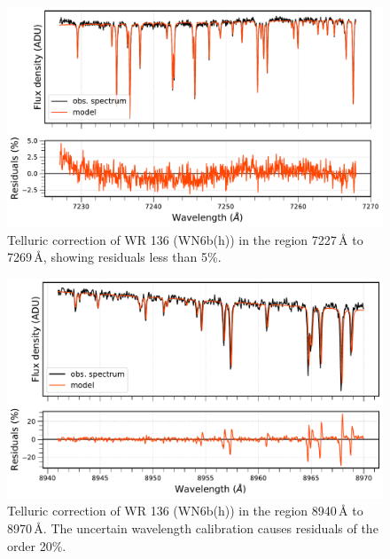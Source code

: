 \begin{figure}
    \centering
    \includegraphics[width=\hsize]{chapters/data_reduction/image/tell_corr_7227_7268.pdf}
    \caption{Telluric correction of WR 136 (WN6b(h)) in the region 7227\,\r{A} to 7269\,\r{A}, showing residuals less than 5\%.}
    \label{fig:tell_corr_7227}
\end{figure}

\begin{figure}
    \centering
    \includegraphics[width=\hsize]{chapters/data_reduction/image/tell_corr_8940_8970.pdf}
    \caption{Telluric correction of WR 136 (WN6b(h)) in the region 8940\,\r{A} to 8970\,\r{A}. The uncertain wavelength calibration causes residuals of the order  20\%.}
    \label{fig:tell_corr}
\end{figure}

